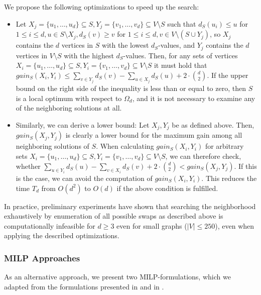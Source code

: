 \documentclass[draft,final]{vutinfth} %
\begin{document}
We propose the following optimizations to speed up the search: 
\begin{itemize}
    \item Let $X_j = \{u_1, \dots, u_d\} \subseteq S, Y_j = \{v_1, \dots, v_d\} \subseteq V \setminus S$ such that $d_S(u_i) \leq u$ for $1 \leq i \leq d, u \in S \setminus X_j, d_S(v) \geq v$ for $1 \leq i \leq d, v \in V \setminus (S \cup Y_j)$, so $X_j$ contains the $d$ vertices in $S$ with the lowest $d_S$-values, and $Y_j$ contains the $d$ vertices in $V\setminus S$ with the highest $d_S$-values.  
    Then, for any sets of vertices $X_i = \{u_1, \dots, u_d\} \subseteq S, Y_i = \{v_1, \dots, v_d\} \subseteq V \setminus S$ it must hold that $\mathit{gain_S}(X_i, Y_i) \leq \sum_{v \in Y_j} d_S(v) - \sum_{u \in X_j} d_S(u) + 2 \cdot \binom{d}{2}$. If the upper bound on the right side of the inequality is less than or equal to zero, then $S$ is a local optimum with respect to $\Omega_d$, and it is not necessary to examine any of the neighboring solutions at all. 
    \item Similarly, we can derive a lower bound: Let $X_j, Y_j$ be as defined above. Then, $\mathit{gain_S}(X_j, Y_j)$ is clearly a lower bound for the maximum gain among all neighboring solutions of $S$. When calculating $\mathit{gain_S}(X_i, Y_i)$ for arbitrary sets $X_i = \{u_1, \dots, u_d\} \subseteq S, Y_i = \{v_1, \dots, v_d\} \subseteq V \setminus S$, we can therefore check, whether $\sum_{u \in Y_i} d_S(u) - \sum_{v \in X_i} d_S(v) + 2 \cdot \binom{d}{2} < \mathit{gain_S}(X_j, Y_j)$. If this is the case, we can avoid the computation of $\mathit{gain_S}(X_i, Y_i)$. This reduces the time $T_d$ from $O(d^2)$ to $O(d)$ if the above condition is fulfilled. 
\end{itemize}

In practice, preliminary experiments have shown that searching the neighborhood exhaustively by enumeration of all possible swaps as described above is computationally infeasible for $d \geq 3$ even for small graphs ($|V| \leq 250$), even when applying the described optimizations. 

\subsubsection{MILP Approaches}

As an alternative approach, we present two MILP-formulations, which we adapted from the formulations presented in \cite{pattillo_maximum_2013} and in \cite{VeremyevPBP16}.
 
\end{document}
